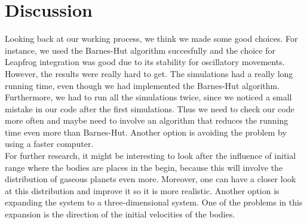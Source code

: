 \section{Discussion}
Looking back at our working process, we think we made some good choices.
For instance, we used the Barnes-Hut algorithm succesfully and the choice for Leapfrog integration was good due to its stability for oscillatory movements.\\

However, the results were really hard to get.
The simulations had a really long running time, even though we had implemented the Barnes-Hut algorithm.
Furthermore, we had to run all the simulations twice, since we noticed a small mistake in our code after the first simulations. 
Thus we need to check our code more often and maybe need to involve an algorithm that reduces the running time even more than Barnes-Hut.
Another option is avoiding the problem by using a faster computer.\\

For further research, it might be interesting to look after the influence of initial range where the bodies are places in the begin, because this will involve the distribution of gaseous planets even more.
Moreover, one can have a closer look at this distribution and improve it so it is more realistic.
Another option is expanding the system to a three-dimensional system.
One of the problems in this expansion is the direction of the initial velocities of the bodies.



